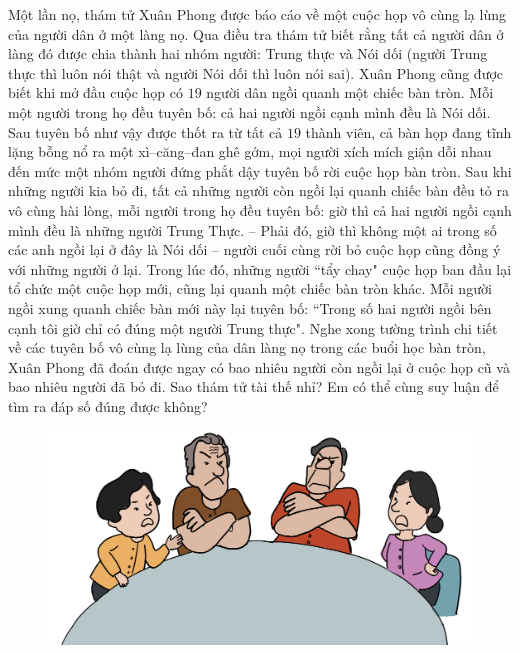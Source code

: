 \begin{multicols}{2}
	Một lần nọ, thám tử Xuân Phong được báo cáo về một cuộc họp vô cùng lạ lùng của người dân ở một làng nọ. Qua điều tra thám tử biết rằng tất cả người dân ở làng đó được chia thành hai nhóm người: Trung thực và Nói dối (người Trung thực thì luôn nói thật và người Nói dối thì luôn nói sai). Xuân Phong cũng được biết khi mở đầu cuộc họp có $19$ người dân ngồi quanh một chiếc bàn tròn. Mỗi một người trong họ đều tuyên bố: cả hai người ngồi cạnh mình đều là Nói dối. Sau tuyên bố như vậy được thốt ra từ tất cả $19$ thành viên, cả bàn họp đang tĩnh lặng bỗng nổ ra một xì--căng--đan ghê gớm, mọi người xích mích giận dỗi nhau đến mức một nhóm người đứng phắt dậy tuyên bố rời cuộc họp bàn tròn.
	\vskip 0.1cm
	Sau khi những người kia bỏ đi, tất cả những người còn ngồi lại quanh chiếc bàn đều tỏ ra vô cùng hài lòng, mỗi người trong họ đều tuyên bố: giờ thì cả hai người ngồi cạnh mình đều là những người Trung Thực.
	\vskip 0.1cm
	-- Phải đó, giờ thì không một ai trong số các anh ngồi lại ở đây là Nói dối --  người cuối cùng rời bỏ cuộc họp cũng đồng ý với những người ở lại.
	\vskip 0.1cm
	Trong lúc đó, những người ``tẩy chay" cuộc họp ban đầu lại tổ chức một cuộc họp mới, cũng lại quanh một chiếc bàn tròn khác. Mỗi người ngồi xung quanh chiếc bàn mới này lại tuyên bố: ``Trong số hai người ngồi bên cạnh tôi giờ chỉ có đúng một người Trung thực".
	\vskip 0.1cm
	Nghe xong tường trình chi tiết về các tuyên bố vô cùng lạ lùng của dân làng nọ trong các buổi học bàn tròn, Xuân Phong đã đoán được ngay có bao nhiêu người còn ngồi lại ở cuộc họp cũ và bao nhiêu người đã bỏ đi. Sao thám tử tài thế nhỉ? Em có thể cùng suy luận để tìm ra đáp số đúng được không?
\end{multicols}
	\begin{figure}[H]
		\vspace*{-5pt}
		\centering
		\captionsetup{labelformat= empty, justification=centering}
		\includegraphics[width= 0.8\linewidth]{xp}
		\vspace*{-5pt}
	\end{figure}
